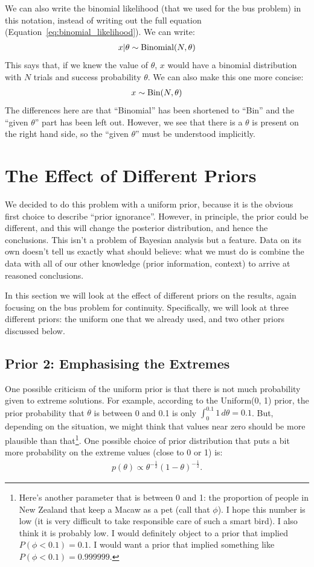 We can also write the binomial likelihood (that we used for the bus problem)
in this notation, instead of writing out
the full equation (Equation~\ref{eq:binomial_likelihood}). We can write:
\begin{eqnarray}
x | \theta \sim \textnormal{Binomial}(N, \theta)
\end{eqnarray}
This says that, if we knew the value of $\theta$, $x$ would have a binomial
distribution with $N$ trials and success probability $\theta$. We can also
make this one more concise:
\begin{eqnarray}
x \sim \textnormal{Bin}(N, \theta)
\end{eqnarray}
The differences here are that ``Binomial'' has been shortened to ``Bin'' and
the ``given $\theta$'' part has been left out. However, we see that there is
a $\theta$ is present on the right hand side, so the ``given $\theta$'' must
be understood implicitly.

\section{The Effect of Different Priors}
We decided to do this problem with a uniform prior, because it is the obvious
first choice to describe ``prior ignorance''. However, in principle, the prior
could be different, and this will change the posterior distribution, and hence
the conclusions. This isn't a problem of Bayesian analysis but a feature. Data
on its own doesn't tell us exactly what should believe: what we must do is
combine the data with all of our other knowledge (prior information, context)
to arrive at reasoned conclusions.

In this section we will look at the effect of different priors
on the results, again focusing on the bus problem for continuity.
Specifically, we will look at three different priors: the
uniform one that we already used, and two other priors discussed below.

\subsection{Prior 2: Emphasising the Extremes}
One possible criticism of the uniform prior is that there is not much probability
given to extreme solutions. For example, according to the Uniform(0, 1) prior,
the prior probability that $\theta$ is
between 0 and 0.1 is only $\int_0^{0.1} 1 \, d\theta = 0.1$. But, depending on the situation, we might think
that values near zero should be more plausible than
that\footnote{Here's another parameter that is between 0 and 1: the proportion of
people in New Zealand that keep a Macaw as a pet (call that $\phi$).
I hope this number is low
(it is very difficult to take responsible care of such a smart bird). I also
think it is probably low. I would definitely object to a prior that implied
$P(\phi < 0.1) = 0.1$. I would want a prior that implied something like
$P(\phi < 0.1) = 0.999999$.}.
One
possible choice of prior distribution
that puts a bit more probability on the extreme values (close to 0 or 1) is:
\begin{eqnarray}
p(\theta) \propto \theta^{-\frac{1}{2}}(1 - \theta)^{-\frac{1}{2}}.\label{eq:prior2}
\end{eqnarray}

